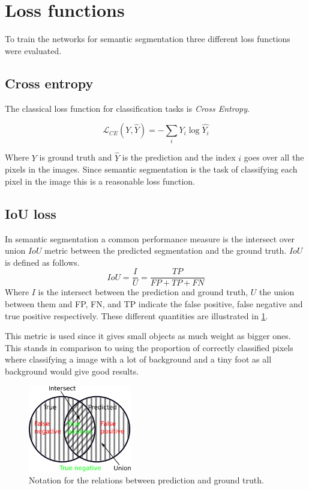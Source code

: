 \documentclass{kththesis}
\begin{document}
\section{Loss functions}
To train the networks for semantic segmentation three different loss functions
were evaluated.

\subsection{Cross entropy}\label{section:cross_entropy}
The classical loss function for classification tasks is
\textit{Cross Entropy}.

\[\mathcal{L}_{CE}(Y, \hat{Y}) =- \sum_i Y_i \log\hat{Y_i}\]

Where \(Y\) is ground truth and \(\hat{Y}\) is the prediction and the index
\(i\) goes over all the pixels in the images. Since
semantic segmentation is the task of classifying each pixel in the image this is
a reasonable loss function.

\subsection{IoU loss} \label{sec:IoU_loss}
In semantic segmentation a common performance measure is the intersect over union
\(IoU\) metric between the predicted segmentation and the ground truth.
\(IoU\) is defined as follows.
\[IoU = \frac{I}{U} = \frac{\textit{TP}}{\textit{FP} + \textit{TP} + \textit{FN}}\]
Where \(I\) is the intersect between the prediction and ground truth, \(U\) the union
between them and FP, FN, and TP indicate the false positive, false negative and
true positive respectively. These different quantities are illustrated in \cref{fig:IoU}.

This metric is used since it gives small objects as much weight as bigger ones.
This stands in comparison to using the proportion of correctly classified pixels
where classifying a image with a lot of background and a tiny foot as all background
would give good results.

\begin{figure}[h]
  \centering
  \includegraphics[width=0.40\textwidth]{IoU}
  \caption{Notation for the relations between prediction and ground truth.}
  \label{fig:IoU}
\end{figure}
\end{document}
